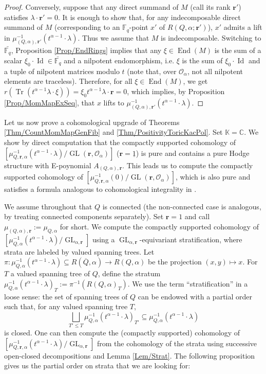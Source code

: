 \documentclass[11pt,english]{article}
\numberwithin{equation}{section}
\numberwithin{figure}{section}
\theoremstyle{definition}
\theoremstyle{plain}
\theoremstyle{remark}
\DeclareMathOperator{\End}{End}
\DeclareMathOperator{\Id}{Id}
\DeclareMathOperator{\Tr}{Tr}
\DeclareMathOperator{\GL}{GL}
\newcommand\rr{\mathbf{r}}
\newcommand\FF{\mathbb{F}}
\newcommand\KK{\mathbb{K}}
\newcommand\CC{\mathbb{C}}
\begin{document}
\begin{proof}
Conversely, suppose that any direct summand of $M$ (call its rank
$\rr'$) satisfies $\lambda\cdot\rr'=0$. It is enough to show that,
for any indecomposable direct summand of $M$ (corresponding to an
$\FF_{q}$-point $x'$ of $R(Q,\alpha;\rr')$), $x'$ admits a lift
in $\mu_{(Q,\alpha),\rr'}^{-1}(t^{\alpha-1}\cdot\lambda)$. Thus we
assume that $M$ is indecomposable. Switching to $\bar{\FF_{q}}$,
Proposition \ref{Prop/EndRings} implies that any $\xi\in\End(M)$
is the sum of a scalar $\xi_{0}\cdot\Id\in\bar{\FF_{q}}$ and a nilpotent
endomorphism, i.e. $\xi$ is the sum of $\xi_{0}\cdot\Id$ and a tuple
of nilpotent matrices modulo $t$ (note that, over $\mathcal{O}_{\alpha}$,
not all nilpotent elements are traceless). Therefore, for all $\xi\in\End(M)$,
we get $r(\Tr(t^{\alpha-1}\lambda\cdot\xi))=\xi_{0}t^{\alpha-1}\lambda\cdot\rr=0$,
which implies, by Proposition \ref{Prop/MomMapExSeq}, that $x$ lifts
to $\mu_{(Q,\alpha),\rr'}^{-1}(t^{\alpha-1}\cdot\lambda)$. \end{proof}

Let us now prove a cohomological upgrade of Theorems \ref{Thm/CountMomMapGenFib}
and \ref{Thm/PositivityToricKacPol}. Set $\KK=\CC$. We show by direct
computation that the compactly supported cohomology of $\left[\mu_{Q,\rr,\alpha}^{-1}(t^{\alpha-1}\cdot\lambda)/\GL(\rr,\mathcal{O}_{\alpha})\right]$
($\rr=\underline{1}$) is pure and contains a pure Hodge structure
with E-poynomial $A_{(Q,\alpha),\rr}$. This leads us to compute the
compactly supported cohomology of $\left[\mu_{Q,\rr,\alpha}^{-1}(0)/\GL(\rr,\mathcal{O}_{\alpha})\right]$,
which is also pure and satisfies a formula analogous to cohomological
integrality in \cite{Dav23c}.

We assume throughout that $Q$ is connected (the non-connected case
is analogous, by treating connected components separately). Set $\rr=1$
and call $\mu_{(Q,\alpha),\rr}:=\mu_{Q,\alpha}$ for short. We compute
the compactly supported cohomology of $\left[\mu_{Q,\alpha}^{-1}(t^{\alpha-1}\cdot\lambda)/\GL_{\alpha,\rr}\right]$
using a $\GL_{\alpha,\rr}$-equivariant stratification, where strata
are labeled by valued spanning trees. Let $\pi:\mu_{Q,\alpha}^{-1}(t^{\alpha-1}\cdot\lambda)\subseteq R(\overline{Q},\alpha)\rightarrow R(Q,\alpha)$
be the projection $(x,y)\mapsto x$. For $T$ a valued spanning tree
of $Q$, define the stratum $\mu_{Q,\alpha}^{-1}(t^{\alpha-1}\cdot\lambda)_{T}:=\pi^{-1}\left(R(Q,\alpha)_{T}\right)$.
We use the term ``stratification'' in a loose sense: the set of
spanning trees of $Q$ can be endowed with a partial order such that,
for any valued spanning tree $T$,\[
\bigsqcup_{T'\leq T}\mu_{Q,\alpha}^{-1}(t^{\alpha-1}\cdot\lambda)_{T'}\subseteq\mu_{Q,\alpha}^{-1}(t^{\alpha-1}\cdot\lambda)
\] is closed. One can then compute the (compactly supported) cohomology
of $\left[\mu_{Q,\rr,\alpha}^{-1}(t^{\alpha-1}\cdot\lambda)/\GL_{\alpha,\rr}\right]$
from the cohomology of the strata using successive open-closed decompositions
and Lemma \ref{Lem/Strat}. The following proposition gives us the
partial order on strata that we are looking for:
\end{document}
